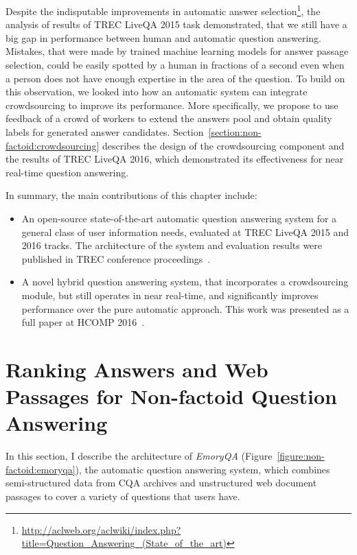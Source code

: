 Despite the indisputable improvements in automatic answer selection\footnote{\href{url}{http://aclweb.org/aclwiki/index.php?title=Question\_Answering\_(State\_of\_the\_art)}}, the analysis of results of TREC LiveQA 2015 task demonstrated, that we still have a big gap in performance between human and automatic question answering.
Mistakes, that were made by trained machine learning models for answer passage selection, could be easily spotted by a human in fractions of a second even when a person does not have enough expertise in the area of the question.
To build on this observation, we looked into how an automatic system can integrate crowdsourcing to improve its performance.
More specifically, we propose to use feedback of a crowd of workers to extend the answers pool and obtain quality labels for generated answer candidates.
Section~\ref{section:non-factoid:crowdsourcing} describes the design of the crowdsourcing component and the results of TREC LiveQA 2016, which demonstrated its effectiveness for near real-time question answering.

In summary, the main contributions of this chapter include:
\begin{itemize}
\item An open-source state-of-the-art automatic question answering system for a general class of user information needs, evaluated at TREC LiveQA 2015 and 2016 tracks.
The architecture of the system and evaluation results were published in TREC conference proceedings~\cite{savenkov2015trec,savenkov2016trec}.
\item A novel hybrid question answering system, that incorporates a crowdsourcing module, but still operates in near real-time, and significantly improves performance over the pure automatic approach.
This work was presented as a full paper at HCOMP 2016~\cite{savenkov_crqa2016}.
\end{itemize}

\section{Ranking Answers and Web Passages for Non-factoid Question Answering}
\label{section:non-factoid:system}

In this section, I describe the architecture of \textit{EmoryQA} (Figure~\ref{figure:non-factoid:emoryqa}), the automatic question answering system, which combines semi-structured data from CQA archives and unstructured web document passages to cover a variety of questions that users have.

